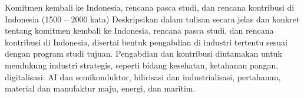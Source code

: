 \documentclass{article}
\begin{document}
Komitmen kembali ke Indonesia, rencana pasca studi, dan rencana kontribusi di Indonesia (1500 – 2000 kata) Deskripsikan dalam tulisan secara jelas dan konkret tentang komitmen kembali ke Indonesia, rencana pasca studi, dan rencana kontribusi di Indonesia, disertai bentuk pengabdian di industri tertentu sesuai dengan program studi tujuan. Pengabdian dan kontribusi diutamakan untuk mendukung industri strategis, seperti bidang kesehatan, ketahanan pangan, digitalisasi: AI dan semikonduktor, hilirisasi dan industrialisasi, pertahanan, material dan manufaktur maju, energi, dan maritim.
\end{document}
